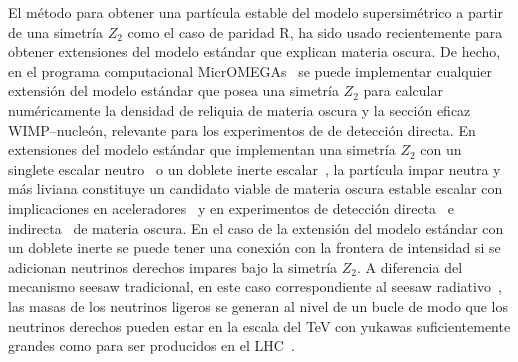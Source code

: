 El método para obtener una partícula estable del modelo supersimétrico
a partir de una simetría $Z_2$ como el caso de paridad R, ha sido
usado recientemente para obtener extensiones del modelo estándar que
explican materia oscura. De hecho, en el programa computacional
MicrOMEGAs~\cite{Belanger:2006is} se puede implementar cualquier
extensión del modelo estándar que posea una simetría $Z_2$ para
calcular numéricamente la densidad de reliquia de materia oscura y la
sección eficaz WIMP--nucleón, relevante para los experimentos de de
detección directa. En extensiones del modelo estándar
que implementan una simetría $Z_2$ con un singlete escalar
neutro~\cite{Yaguna:2008hd,Goudelis:2009zz,Yaguna:2011qn} o un doblete
inerte escalar~\cite{}, la partícula impar neutra y más liviana
constituye un candidato viable de materia oscura estable escalar con
implicaciones en aceleradores~\cite{} y en experimentos de detección
directa~\cite{} e indirecta~\cite{Goudelis:2009zz} de materia oscura. En el
caso de la extensión del modelo estándar con un doblete inerte se
puede tener una conexión con la frontera de intensidad si se adicionan
neutrinos derechos impares bajo la simetría $Z_2$. A diferencia del
mecanismo seesaw tradicional, en este caso correspondiente al seesaw
radiativo~\cite{}, las masas de los neutrinos ligeros se generan al nivel
de un bucle de modo que los neutrinos derechos pueden estar en la escala del
TeV con yukawas suficientemente grandes como para ser producidos en
el LHC~\cite{Sierra:2008wj}.




